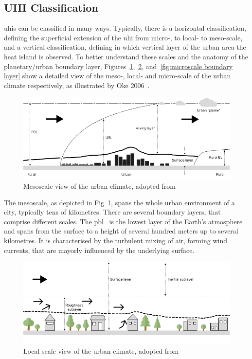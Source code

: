 \subsection{UHI Classification}

\gls{uhi}s can be classified in many ways. Typically, there is a horizontal classification, defining the superficial extension of the \gls{uhi} from micro-, to local- to meso-scale, and a vertical classification, defining in which vertical layer of the urban area the heat island is observed. To better understand these scales and the anatomy of the planetary/urban boundary layer, Figures~\ref{fig:mesoscale boundary layer},~\ref{fig:localscale boundary layer}, and~\ref{fig:microscale boundary layer} show a detailed view of the meso-, local- and micro-scale of the urban climate respectively, as illustrated by Oke 2006~\cite{oke2006guideline}.

\begin{figure}[h]
    \centering
    \includegraphics[width=\textwidth]{images/Mesoscale Boundary Layer.png}
    \caption{Mesoscale view of the urban climate, adopted from~\cite{oke2006guideline}}
    \label{fig:mesoscale boundary layer}
\end{figure}

The mesoscale, as depicted in Fig~\ref{fig:mesoscale boundary layer}, spans the whole urban environment of a city, typically tens of kilometres. There are several boundary layers, that comprise different scales. The \gls{pbl}~\cite{wyngaard1985structure} is the lowest layer of the Earth's atmosphere and spans from the surface to a height of several hundred meters up to several kilometres. It is characterised by the turbulent mixing of air, forming wind currents, that are mayorly influenced by the underlying surface.

\begin{figure}[h]
    \centering
    \includegraphics[width=\textwidth]{images/Localscale Boundary Layer.png}
    \caption{Local scale view of the urban climate, adopted from~\cite{oke2006guideline}}
    \label{fig:localscale boundary layer}
\end{figure}

